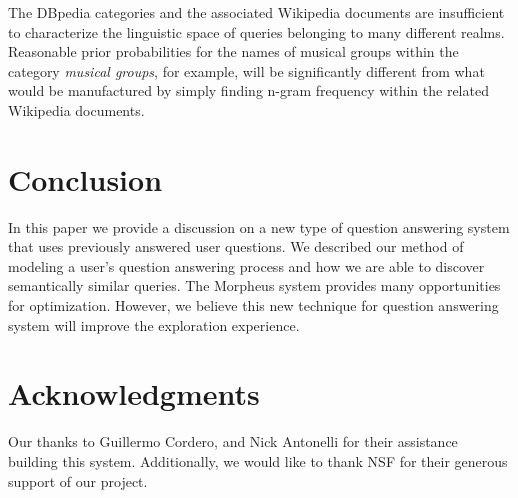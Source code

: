 The DBpedia categories
and the associated Wikipedia documents are insufficient to
characterize the linguistic space of queries belonging to many
different realms.  Reasonable prior probabilities for the names of
musical groups within the category \emph{musical groups}, for example,
will be significantly different from what would be manufactured by
simply finding n-gram frequency within the related Wikipedia
documents.





\section{Conclusion}

In this paper we provide a discussion on a new type of question
answering system that uses previously answered user questions.  We
described our method of modeling a user's question answering process
and how we are able to discover semantically similar queries.  The Morpheus system provides many opportunities for optimization.  However, we believe this new technique for question answering system will improve the exploration experience.


\section{Acknowledgments}
Our thanks to Guillermo Cordero, and Nick Antonelli for their assistance building this system. Additionally, we would like to thank NSF for their generous support of our project.
